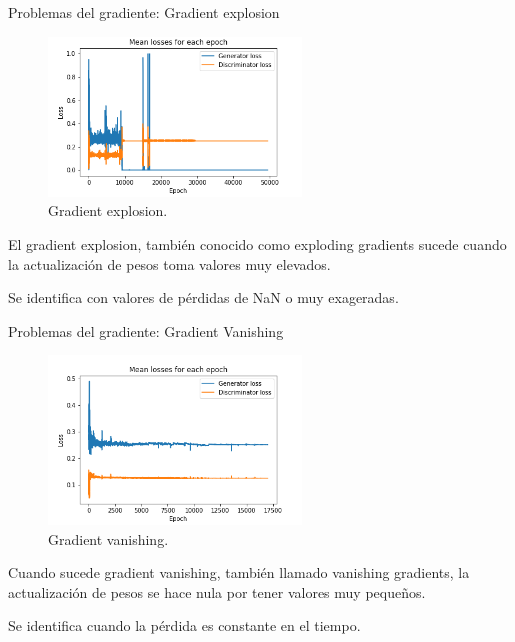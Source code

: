\begin{frame}{Problemas del gradiente: Gradient explosion}

    \begin{figure}
        \centering
        \includegraphics[width=0.6\textwidth]{Slides/figures/GAN/GradientExplosion.png}
        \caption{Gradient explosion.}
    \end{figure}
    
    El \alert{gradient explosion}, también conocido como \alert{exploding gradients} sucede cuando la actualización de pesos toma valores \alert{muy elevados}.
    
    Se identifica con valores de pérdidas de \alert{NaN o muy exageradas}.
    
\end{frame}

\begin{frame}{Problemas del gradiente: Gradient Vanishing}

    \begin{figure}
        \centering
        \includegraphics[width=0.6\textwidth]{Slides/figures/GAN/GradientVanishing.png}
        \caption{Gradient vanishing.}
    \end{figure}
    
    Cuando sucede \alert{gradient vanishing}, también llamado \alert{vanishing gradients}, la actualización de pesos se hace \alert{nula} por tener valores \alert{muy pequeños}.
    
    Se identifica cuando la pérdida es \alert{constante en el tiempo}.
    
\end{frame}

